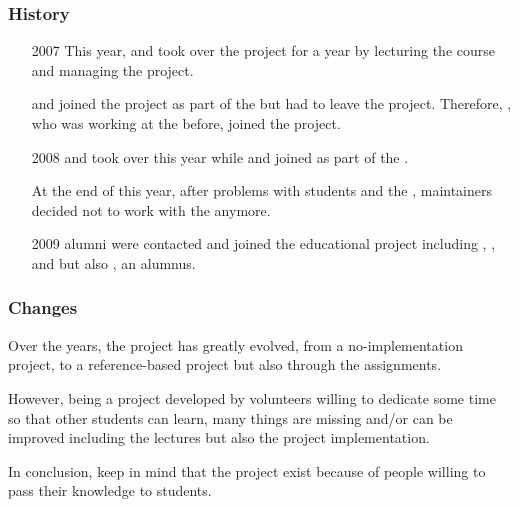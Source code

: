 \begin{frame}
  \frametitle{History}

  \begin{itemize}
    \item[2007]
      This year,  and  took
      over the project for a year by lecturing the course and managing the
      project.

      \-

       and  joined the project
      as part of the  but  had to leave the
      project. Therefore, , who was working at the
       before, joined the project.
    \item[2008]
       and  took over this year
      while  and  joined as part
      of the .

      \-

      At the end of this year, after problems with students and the ,
       maintainers decided not to work with the 
      anymore.
    \item[2009]
       alumni were contacted and joined the educational project
      including , ,
       and  but also
      , an  alumnus.
  \end{itemize}
\end{frame}


\begin{frame}
  \frametitle{Changes}

  Over the years, the project has greatly evolved, from a no-implementation
  project, to a reference-based project but also through the assignments.

  \-

  However, being a project developed by volunteers willing to dedicate some
  time so that other students can learn, many things are missing and/or
  can be improved including the lectures but also the project implementation.

  \-

  In conclusion, keep in mind that the project exist because of people
  willing to pass their knowledge to students.
\end{frame}

